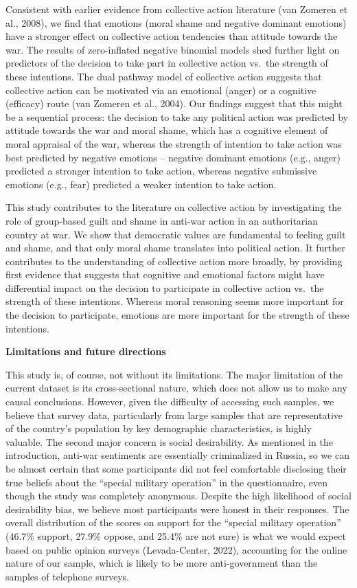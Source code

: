 \documentclass[
]{article}
\begin{document}
Consistent with earlier evidence from collective action literature (van Zomeren et al., 2008), we find that emotions (moral shame and negative dominant emotions) have a stronger effect on collective action tendencies than attitude towards the war. The results of zero-inflated negative binomial models shed further light on predictors of the decision to take part in collective action vs.~the strength of these intentions. The dual pathway model of collective action suggests that collective action can be motivated via an emotional (anger) or a cognitive (efficacy) route (van Zomeren et al., 2004). Our findings suggest that this might be a sequential process: the decision to take any political action was predicted by attitude towards the war and moral shame, which has a cognitive element of moral appraisal of the war, whereas the strength of intention to take action was best predicted by negative emotions -- negative dominant emotions (e.g., anger) predicted a stronger intention to take action, whereas negative submissive emotions (e.g., fear) predicted a weaker intention to take action.

This study contributes to the literature on collective action by investigating the role of group-based guilt and shame in anti-war action in an authoritarian country at war. We show that democratic values are fundamental to feeling guilt and shame, and that only moral shame translates into political action. It further contributes to the understanding of collective action more broadly, by providing first evidence that suggests that cognitive and emotional factors might have differential impact on the decision to participate in collective action vs.~the strength of these intentions. Whereas moral reasoning seems more important for the decision to participate, emotions are more important for the strength of these intentions.

\textbf{Limitations and future directions}

This study is, of course, not without its limitations. The major limitation of the current dataset is its cross-sectional nature, which does not allow us to make any causal conclusions. However, given the difficulty of accessing such samples, we believe that survey data, particularly from large samples that are representative of the country's population by key demographic characteristics, is highly valuable. The second major concern is social desirability. As mentioned in the introduction, anti-war sentiments are essentially criminalized in Russia, so we can be almost certain that some participants did not feel comfortable disclosing their true beliefs about the ``special military operation'' in the questionnaire, even though the study was completely anonymous. Despite the high likelihood of social desirability bias, we believe most participants were honest in their responses. The overall distribution of the scores on support for the ``special military operation'' (46.7\% support, 27.9\% oppose, and 25.4\% are not sure) is what we would expect based on public opinion surveys (Levada-Center, 2022), accounting for the online nature of our sample, which is likely to be more anti-government than the samples of telephone surveys.
\end{document}
